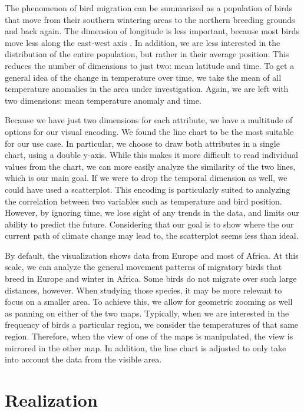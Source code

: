 \documentclass[journal]{vgtc}                %
\begin{document}
The phenomenon of bird migration can be summarized as a population of birds that move from their southern wintering areas to the northern breeding grounds and back again. The dimension of longitude is less important, because most birds move less along the east-west axis \cite{alerstam1993bird}. In addition, we are less interested in the distribution of the entire population, but rather in their average position. This reduces the number of dimensions to just two: mean latitude and time. To get a general idea of the change in temperature over time, we take the mean of all temperature anomalies in the area under investigation. Again, we are left with two dimensions: mean temperature anomaly and time.

Because we have just two dimensions for each attribute, we have a multitude of options for our visual encoding. We found the line chart to be the most suitable for our use case. In particular, we choose to draw both attributes in a single chart, using a double y-axis. While this makes it more difficult to read individual values from the chart, we can more easily analyze the similarity of the two lines, which is our main goal. If we were to drop the temporal dimension as well, we could have used a scatterplot. This encoding is particularly suited to analyzing the correlation between two variables such as temperature and bird position. However, by ignoring time, we lose sight of any trends in the data, and limits our ability to predict the future. Considering that our goal is to show where the our current path of climate change may lead to, the scatterplot seems less than ideal.

By default, the visualization shows data from Europe and most of Africa. At this scale, we can analyze the general movement patterns of migratory birds that breed in Europe and winter in Africa. Some birds do not migrate over such large distances, however. When studying those species, it may be more relevant to focus on a smaller area. To achieve this, we allow for geometric zooming as well as panning on either of the two maps. Typically, when we are interested in the frequency of birds a particular region, we consider the temperatures of that same region. Therefore, when the view of one of the maps is manipulated, the view is mirrored in the other map. In addition, the line chart is adjusted to only take into account the data from the visible area.

\section{Realization}
\end{document}
